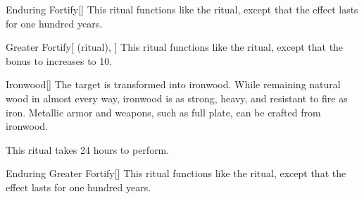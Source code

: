 \lowercase{\hypertarget{spell:Enduring Fortify}{}}\label{spell:Enduring Fortify}
\begin{apability}[Rank 4]{\hypertarget{spell:Enduring Fortify}{Enduring Fortify}}[]
This ritual functions like the  ritual, except that the effect lasts for one hundred years.
\end{apability}
\vspace{0.25em}



\lowercase{\hypertarget{spell:Greater Fortify}{}}\label{spell:Greater Fortify}
\begin{attuneability}[Rank 4]{\hypertarget{spell:Greater Fortify}{Greater Fortify}}[ (ritual), ]
This ritual functions like the  ritual, except that the bonus to  increases to 10.
\end{attuneability}
\vspace{0.25em}



\lowercase{\hypertarget{spell:Ironwood}{}}\label{spell:Ironwood}
\begin{apability}[Rank 4]{\hypertarget{spell:Ironwood}{Ironwood}}[]
The target is transformed into ironwood.
While remaining natural wood in almost every way, ironwood is as strong, heavy, and resistant to fire as iron.
Metallic armor and weapons, such as full plate, can be crafted from ironwood.

This ritual takes 24 hours to perform.
\end{apability}
\vspace{0.25em}



\lowercase{\hypertarget{spell:Enduring Greater Fortify}{}}\label{spell:Enduring Greater Fortify}
\begin{apability}[Rank 5]{\hypertarget{spell:Enduring Greater Fortify}{Enduring Greater Fortify}}[]
This ritual functions like the  ritual, except that the effect lasts for one hundred years.
\end{apability}
\vspace{0.25em}



